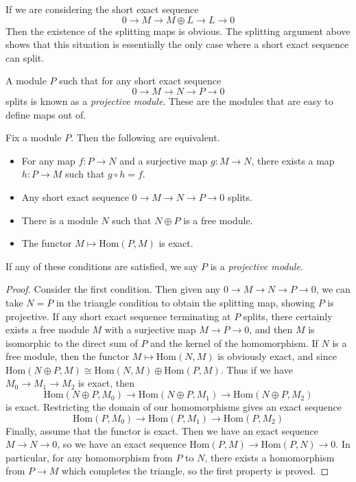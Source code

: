 \begin{remark}
    If we are considering the short exact sequence
    \[ 0 \to M \to M \oplus L \to L \to 0 \]
    Then the existence of the splitting maps is obvious. The splitting argument above shows that this situation is essentially the only case where a short exact sequence can split.
\end{remark}

A module $P$ such that for any short exact sequence
%
\[ 0 \to M \to N \to P \to 0 \]
%
splits is known as a \emph{projective module}. These are the modules that are easy to define maps out of.

\begin{theorem}
    Fix a module $P$. Then the following are equivalent.
    \begin{itemize}
        \item For any map $f: P \to N$ and a surjective map $g: M \to N$, there exists a map $h: P \to M$ such that $g \circ h = f$.

        \item Any short exact sequence $0 \to M \to N \to P \to 0$ splits.

        \item There is a module $N$ such that $N \oplus P$ is a free module.

        \item The functor $M \mapsto \text{Hom}(P,M)$ is exact.
    \end{itemize}
    If any of these conditions are satisfied, we say $P$ is a \emph{projective module}.
\end{theorem}
\begin{proof}
    Consider the first condition. Then given any $0 \to M \to N \to P \to 0$, we can take $N = P$ in the triangle condition to obtain the splitting map, showing $P$ is projective. If any short exact sequence terminating at $P$ splits, there certainly exists a free module $M$ with a surjective map $M \to P \to 0$, and then $M$ is isomorphic to the direct sum of $P$ and the kernel of the homomorphism. If $N$ is a free module, then the functor $M \mapsto \text{Hom}(N,M)$ is obviously exact, and since $\text{Hom}(N \oplus P, M) \cong \text{Hom}(N,M) \oplus \text{Hom}(P,M)$. Thus if we have $M_0 \to M_1 \to M_2$ is exact, then
    \[ \text{Hom}(N \oplus P, M_0) \to \text{Hom}(N \oplus P, M_1) \to \text{Hom}(N \oplus P, M_2) \]
    is exact. Restricting the domain of our homomorphisms gives an exact sequence
    \[ \text{Hom}(P,M_0) \to \text{Hom}(P,M_1) \to \text{Hom}(P,M_2) \]
    Finally, assume that the functor is exact. Then we have an exact sequence $M \to N \to 0$, so we have an exact sequence $\text{Hom}(P,M) \to \text{Hom}(P,N) \to 0$. In particular, for any homomorphism from $P$ to $N$, there exists a homomorphism from $P \to M$ which completes the triangle, so the first property is proved.
\end{proof}

